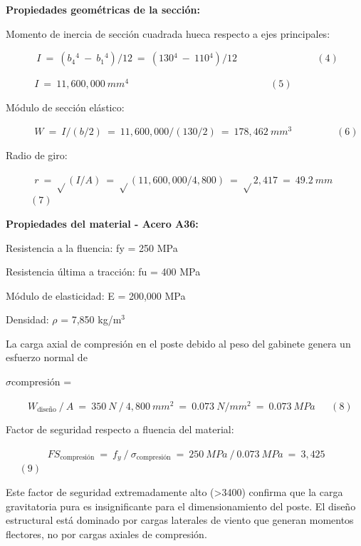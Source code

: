 \documentclass[12pt,a4paper,oneside]{report}
\begin{document}
\textbf{Propiedades geométricas de la sección:}

Momento de inercia de sección cuadrada hueca respecto a ejes principales:

\(\ \ \ \ \ \ \ \ \ \ \ \ \ \ I\  = \ (b\ensuremath{_{4}}\ensuremath{^{4}}\  - \ b\ensuremath{_{1}}\ensuremath{^{4}})/12\  = \ (130\ensuremath{^{4}}\  - \ 110\ensuremath{^{4}})/12\)\(\ \ \ \ \ \ \ \ \ \ \ \ \ \ \ \ \ \ \ \ \ \ \ \ \ \ \ \ \ \ \ \ \ \ \ \ (4)\ \)

\(\ \ \ \ \ \ \ \ \ \ \ \ \ I\  = \ 11,600,000\ mm\ensuremath{^{4}}\ \)\(\ \ \ \ \ \ \ \ \ \ \ \ \ \ \ \ \ \ \ \ \ \ \ \ \ \ \ \ \ \ \ \ \ \ \ \ \ \ \ \ \ \ \ \ \ \ \ \ \ \ \ \ \ \ \ \ \ \ \ \ \ \ \ (5)\ \)

Módulo de sección elástico:

\(\ \ \ \ \ \ \ \ \ \ \ \ \ W\  = \ I/(b/2)\  = \ 11,600,000/(130/2)\  = \ 178,462\ mm\ensuremath{^{3}}\ \)\(\ \ \ \ \ \ \ \ \ \ \ \ \ \ \ \ \ \ \ (6)\ \)

Radio de giro:

\(\ \ \ \ \ \ \ \ \ \ \ \ \ r\  = \ \sqrt{}(I/A)\  = \ \sqrt{}(11,600,000/4,800)\  = \ \sqrt{}2,417\  = \ 49.2\ mm\ \)\(\ \ \ \ \ \ \ \ \ \ \ (7)\ \)

\textbf{Propiedades del material - Acero A36:}

Resistencia a la fluencia: fy = 250 MPa

Resistencia última a tracción: fu = 400 MPa

Módulo de elasticidad: E = 200,000 MPa

Densidad: \ensuremath{\rho} = 7,850 kg/m\ensuremath{^{3}}

La carga axial de compresión en el poste debido al peso del gabinete genera un esfuerzo normal de

\ensuremath{\sigma}compresión =

\(\ \ \ \ \ \ \ \ \ \ W_{\text{diseño}}\ /\ A\  = \ 350\ N\ /\ 4,800\ mm\ensuremath{^{2}}\  = \ 0.073\ N/mm\ensuremath{^{2}}\  = \ 0.073\ MPa\ \)\(\ \ \ \ \ \ (8)\ \)

Factor de seguridad respecto a fluencia del material:

\(\ \ \ \ \ \ \ \ \ \ \ \ \ \ \ \ \ \ \ FS_{\text{compresión}}\  = \ f_{y}\ /\ \sigma_{\text{compresión}}\  = \ 250\ MPa\ /\ 0.073\ MPa\  = \ 3{,}425\ \)\(\ \ \ \ \ \ (9)\ \)

Este factor de seguridad extremadamente alto (\textgreater3400) confirma que la carga gravitatoria pura es insignificante para el dimensionamiento del poste. El diseño estructural está dominado por cargas laterales de viento que generan momentos flectores, no por cargas axiales de compresión.
\end{document}
